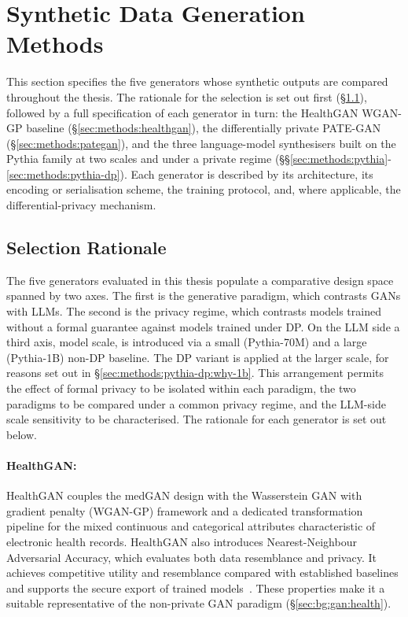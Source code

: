 
\section{Synthetic Data Generation Methods}
\label{sec:method:generators}


This section specifies the five generators whose synthetic outputs are
compared throughout the thesis. The rationale for the selection is set out
first (\S\ref{sec:methods:rationale}), followed by a full specification of
each generator in turn: the HealthGAN WGAN-GP baseline
(\S\ref{sec:methods:healthgan}), the differentially private PATE-GAN
(\S\ref{sec:methods:pategan}), and the three language-model synthesisers built
on the Pythia family at two scales and under a private regime
(\S\S\ref{sec:methods:pythia}-\ref{sec:methods:pythia-dp}). Each generator is
described by its architecture, its encoding or serialisation scheme, the
training protocol, and, where applicable, the differential-privacy mechanism.

\subsection{Selection Rationale}
\label{sec:methods:rationale}

The five generators evaluated in this thesis populate a comparative design
space spanned by two axes. The first is the generative paradigm, which
contrasts GANs with LLMs. The second is the privacy regime, which contrasts models
trained without a formal guarantee against models trained under DP.
On the LLM side a third axis, model scale, is introduced via a small
(Pythia-70M) and a large (Pythia-1B) non-DP baseline. The DP variant is
applied at the larger scale, for reasons set out in
\S\ref{sec:methods:pythia-dp:why-1b}. This arrangement permits the effect
of formal privacy to be isolated within each paradigm, the two paradigms
to be compared under a common privacy regime, and the LLM-side scale
sensitivity to be characterised. The rationale for each generator is set
out below.

\paragraph{HealthGAN:}
HealthGAN couples the medGAN design with the Wasserstein GAN with gradient
penalty (WGAN-GP) framework and a dedicated transformation pipeline for the
mixed continuous and categorical attributes characteristic of electronic
health records. HealthGAN also introduces Nearest-Neighbour Adversarial Accuracy, which
evaluates both data resemblance and privacy. It achieves competitive
utility and resemblance compared with established baselines and supports
the secure export of trained models~\cite{healthgan}. These properties make it a
suitable representative of the non-private GAN paradigm
(\S\ref{sec:bg:gan:health}).

